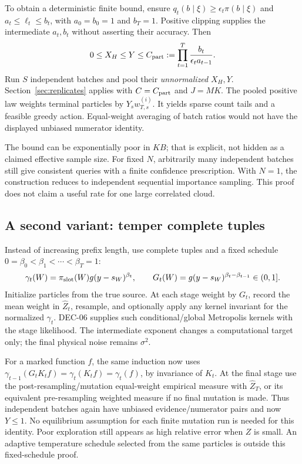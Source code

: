\documentclass[10pt,a4paper]{article}
\begin{document}
To obtain a deterministic finite bound, ensure
$q_t(b\mid\xi)\geq\epsilon_t\pi(b\mid\xi)$ and
$a_t\leq\ell_t\leq b_t$, with $a_0=b_0=1$ and $b_T=1$.
Positive clipping supplies the intermediate $a_t,b_t$ without asserting their accuracy.
Then
\begin{equation}
 0\leq X_H\leq Y\leq C_{\rm part}:=
       \prod_{t=1}^T\frac{b_t}{\epsilon_t a_{t-1}}.
 \label{eq:particle-bound}
\end{equation}
Run $S$ independent batches and pool their \emph{unnormalized} $X_H,Y$.
Section~\ref{sec:replicates} applies with $C=C_{\rm part}$ and $J=MK$.
The pooled positive law weights terminal particles by $Y_s w_{T,s}^{(i)}$.
It yields sparse count tails and a feasible greedy action. Equal-weight averaging of batch ratios
would not have the displayed unbiased numerator identity.

The bound can be exponentially poor in $KB$; that is explicit, not hidden as a claimed effective sample size.
For fixed $N$, arbitrarily many independent batches still give consistent queries with a finite
confidence prescription. With $N=1$, the construction reduces to independent sequential importance sampling.
This proof does not claim a useful rate for one large correlated cloud.

\subsection{A second variant: temper complete tuples}
Instead of increasing prefix length, use complete tuples and a fixed schedule
$0=\beta_0<\beta_1<\cdots<\beta_T=1$:
\[
 \gamma_t(W)=\pi_{\rm slot}(W)g(y-s_W)^{\beta_t},\qquad
 G_t(W)=g(y-s_W)^{\beta_t-\beta_{t-1}}\in(0,1].
\]
Initialize particles from the true source. At each stage weight by $G_t$, record the mean weight in
$\widehat Z_t$, resample, and optionally apply any kernel invariant for the normalized $\gamma_t$.
DEC-06 supplies such conditional/global Metropolis kernels with the stage likelihood.
The intermediate exponent changes a computational target only; the final physical noise remains $\sigma^2$.

For a marked function $f$, the same induction now uses
$\gamma_{t-1}(G_t K_t f)=\gamma_t(K_t f)=\gamma_t(f)$, by invariance of $K_t$.
At the final stage use the post-resampling/mutation equal-weight empirical measure with $\widehat Z_T$,
or its equivalent pre-resampling weighted measure if no final mutation is made.
Thus independent batches again have unbiased evidence/numerator pairs and now $Y\leq1$.
No equilibrium assumption for each finite mutation run is needed for this identity.
Poor exploration still appears as high relative error when $Z$ is small.
An adaptive temperature schedule selected from the same particles is outside this fixed-schedule proof.
\end{document}
